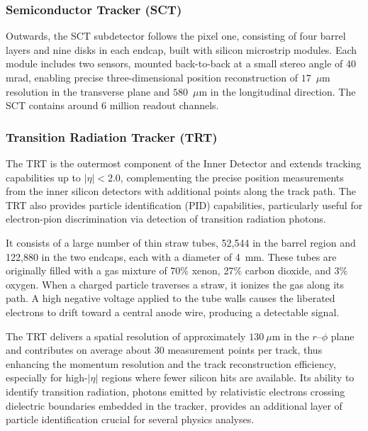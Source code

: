 
\subsubsection*{Semiconductor Tracker (SCT)}

Outwards, the SCT subdetector follows the pixel one, consisting of four barrel layers and nine disks in each endcap, built with silicon microstrip modules. Each module includes two sensors, mounted back-to-back at a small stereo angle of 40 mrad, enabling precise three-dimensional position reconstruction of $17$~$\mu$m resolution in the transverse plane and $580$~$\mu$m in the longitudinal direction. 
The SCT contains around 6 million readout channels.

\subsubsection*{Transition Radiation Tracker (TRT)}

The TRT is the outermost component of the Inner Detector and extends tracking capabilities up to $|\eta| < 2.0$, complementing the precise position measurements from the inner silicon detectors with additional points along the track path. The TRT also provides particle identification (PID) capabilities, particularly useful for electron-pion discrimination via detection of transition radiation photons.

It consists of a large number of thin straw tubes, 52,544 in the barrel region and 122,880 in the two endcaps, each with a diameter of 4~mm. These tubes are originally filled with a gas mixture of 70\% xenon, 27\% carbon dioxide, and 3\% oxygen. When a charged particle traverses a straw, it ionizes the gas along its path. A high negative voltage applied to the tube walls causes the liberated electrons to drift toward a central anode wire, producing a detectable signal. 

The TRT delivers a spatial resolution of approximately $130~\mu\text{m}$ in the $r\text{--}\phi$ plane and contributes on average about 30 measurement points per track, thus enhancing the momentum resolution and the track reconstruction efficiency, especially for high-$|\eta|$ regions where fewer silicon hits are available. Its ability to identify transition radiation, photons emitted by relativistic electrons crossing dielectric boundaries embedded in the tracker, provides an additional layer of particle identification crucial for several physics analyses.

